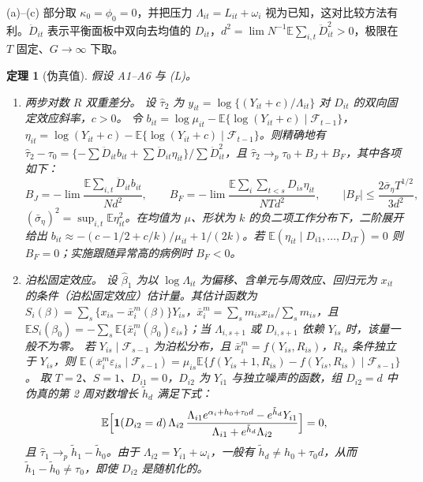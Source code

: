 \documentclass[11pt,a4paper]{ctexart}
\newtheorem{theorem}{定理}
\theoremstyle{definition}
\newcommand{\E}{\mathbb{E}}
\newcommand{\F}{\mathcal{F}}
\newcommand{\ind}{\mathbf{1}}
\begin{document}
(a)--(c) 部分取 $\kappa_0=\phi_0=0$，并把压力 $\Lambda_{it}=L_{it}+\omega_i$ 视为已知，这对比较方法有利。$\ddot D_{it}$ 表示平衡面板中双向去均值的 $D_{it}$，$d^2=\lim N^{-1}\E\sum_{i,t}\ddot D_{it}^2>0$，极限在 $T$ 固定、$G\to\infty$ 下取。

\begin{theorem}[伪真值]
\label{thm:bias}
假设 A1--A6 与 (L)。
\begin{enumerate}[leftmargin=2em,label=(\alph*)]
\item \emph{两步对数 $R$ 双重差分。} 设 $\hat\tau_2$ 为 $y_{it}=\log\{(Y_{it}+c)/\Lambda_{it}\}$ 对 $D_{it}$ 的双向固定效应斜率，$c>0$\citep{feng2024parallel}。
令 $b_{it}=\log\mu_{it}-\E\{\log(Y_{it}+c)\mid\F_{t-1}\}$，$\eta_{it}=\log(Y_{it}+c)-\E\{\log(Y_{it}+c)\mid\F_{t-1}\}$。则精确地有 $\hat\tau_2-\tau_0=\{-\sum\ddot D_{it}b_{it}+\sum\ddot D_{it}\eta_{it}\}/\sum\ddot D_{it}^2$，且 $\hat\tau_2\to_p\tau_0+B_J+B_F$，其中各项如下：
\[
B_J=-\lim\frac{\E\sum_{i,t}\ddot D_{it}b_{it}}{Nd^2},\qquad
B_F=-\lim\frac{\E\sum_i\sum_{t<s}D_{is}\eta_{it}}{NTd^2},\qquad
|B_F|\le\frac{2\bar\sigma_\eta T^{1/2}}{3d^2},
\]
$(\bar\sigma_\eta)^2=\sup_{i,t}\E\eta_{it}^2$。在均值为 $\mu$、形状为 $k$ 的负二项工作分布下，二阶展开给出 $b_{it}\approx-(c-1/2+c/k)/\mu_{it}+1/(2k)$。若 $\E(\eta_{it}\mid D_{i1},\dots,D_{iT})=0$ 则 $B_F=0$；实施跟随异常高的病例时 $B_F<0$。
\item \emph{泊松固定效应。} 设 $\hat\beta_1$ 为以 $\log\Lambda_{it}$ 为偏移、含单元与周效应、回归元为 $x_{it}$ 的条件（泊松固定效应）估计量。其估计函数为 $S_i(\beta)=\sum_s\{x_{is}-\bar x^m_i(\beta)\}Y_{is}$，$\bar x^m_i=\sum_s m_{is}x_{is}/\sum_s m_{is}$，且 $\E S_i(\beta_0)=-\sum_s\E\{\bar x^m_i(\beta_0)\varepsilon_{is}\}$；当 $\Lambda_{i,s+1}$ 或 $D_{i,s+1}$ 依赖 $Y_{is}$ 时，该量一般不为零。
若 $Y_{is}\mid\F_{s-1}$ 为泊松分布，且 $\bar x^m_i=f(Y_{is},R_{is})$，$R_{is}$ 条件独立于 $Y_{is}$，则 $\E(\bar x^m_i\varepsilon_{is}\mid\F_{s-1})=\mu_{is}\E\{f(Y_{is}+1,R_{is})-f(Y_{is},R_{is})\mid\F_{s-1}\}$\citep{chen1975poisson}。
取 $T=2$、$S=1$、$D_{i1}=0$，$D_{i2}$ 为 $Y_{i1}$ 与独立噪声的函数，组 $D_{i2}=d$ 中伪真的第 2 周对数增长 $\tilde h_d$ 满足下式：
\begin{equation}
\E\Bigl[\ind(D_{i2}=d)\,\Lambda_{i2}\,\frac{\Lambda_{i1}e^{\alpha_i+h_0+\tau_0d}-e^{\tilde h_d}Y_{i1}}{\Lambda_{i1}+e^{\tilde h_d}\Lambda_{i2}}\Bigr]=0,
\label{eq:t2fe}
\end{equation}
且 $\hat\tau_1\to_p\tilde h_1-\tilde h_0$。由于 $\Lambda_{i2}=Y_{i1}+\omega_i$，一般有 $\tilde h_d\ne h_0+\tau_0d$，从而 $\tilde h_1-\tilde h_0\ne\tau_0$，即使 $D_{i2}$ 是随机化的。

\end{enumerate}
\end{theorem}
\end{document}
